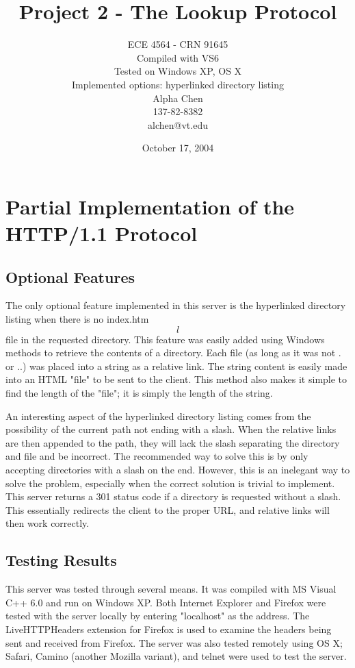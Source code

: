 \documentclass[11pt]{report}
\title{Project 2 - The Lookup Protocol}
\author{ECE 4564 - CRN 91645\\
Compiled with VS6\\
Tested on Windows XP, OS X\\
Implemented options: hyperlinked directory listing\\
Alpha Chen\\
137-82-8382\\
alchen@vt.edu}
\date{October 17, 2004}
\begin{document}
\maketitle

\chapter{Partial Implementation of the HTTP/1.1 Protocol}

\section{Optional Features}

The only optional feature implemented in this server is the hyperlinked directory listing when there is no index.htm\[l\] file in the requested directory. This feature was easily added using Windows methods to retrieve the contents of a directory. Each file (as long as it was not . or ..) was placed into a string as a relative link. The string content is easily made into an HTML "file" to be sent to the client. This method also makes it simple to find the length of the "file"; it is simply the length of the string.

An interesting aspect of the hyperlinked directory listing comes from the possibility of the current path not ending with a slash. When the relative links are then appended to the path, they will lack the slash separating the directory and file and be incorrect. The recommended way to solve this is by only accepting directories with a slash on the end. However, this is an inelegant way to solve the problem, especially when the correct solution is trivial to implement. This server returns a 301 status code if a directory is requested without a slash. This essentially redirects the client to the proper URL, and relative links will then work correctly.

\newpage

\section{Testing Results}

This server was tested through several means. It was compiled with MS Visual C++ 6.0 and run on Windows XP. Both Internet Explorer and Firefox were tested with the server locally by entering "localhost" as the address. The LiveHTTPHeaders extension for Firefox is used to examine the headers being sent and received from Firefox. The server was also tested remotely using OS X; Safari, Camino (another Mozilla variant), and telnet were used to test the server.
\end{document}
